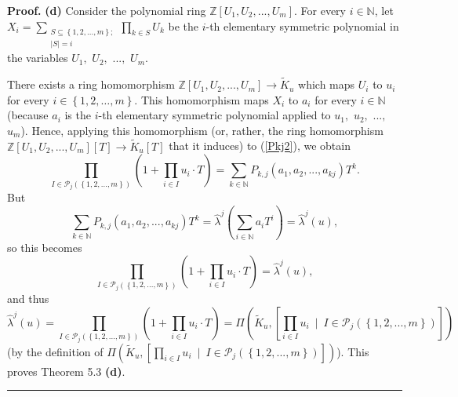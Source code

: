 \documentclass[numbers=enddot,12pt,final,onecolumn,notitlepage]{scrartcl}%
\newenvironment{proof}[1][Proof]{\noindent\textbf{#1.} }{\ \rule{0.5em}{0.5em}}
\begin{document}
\begin{proof}
\textbf{(d)} Consider the polynomial ring $\mathbb{Z}\left[  U_{1}%
,U_{2},...,U_{m}\right]  $. For every $i\in\mathbb{N}$, let $X_{i}%
=\sum\limits_{\substack{S\subseteq\left\{  1,2,...,m\right\}  ;\\\left\vert
S\right\vert =i}}\prod\limits_{k\in S}U_{k}$ be the $i$-th elementary
symmetric polynomial in the variables $U_{1},$ $U_{2},$ $...,$ $U_{m}$.

There exists a ring homomorphism $\mathbb{Z}\left[  U_{1},U_{2},...,U_{m}%
\right]  \rightarrow\widetilde{K}_{u}$ which maps $U_{i}$ to $u_{i}$ for every
$i\in\left\{  1,2,\ldots,m\right\}  $. This homomorphism maps $X_{i}$ to
$a_{i}$ for every $i\in\mathbb{N}$ (because $a_{i}$ is the $i$-th elementary
symmetric polynomial applied to $u_{1},$ $u_{2},$ $...,$ $u_{m}$). Hence,
applying this homomorphism (or, rather, the ring homomorphism $\mathbb{Z}%
\left[  U_{1},U_{2},...,U_{m}\right]  \left[  T\right]  \rightarrow
\widetilde{K}_{u}\left[  T\right]  $ that it induces) to (\ref{Pkj2}), we
obtain%
\[
\prod_{I\in\mathcal{P}_{j}\left(  \left\{  1,2,...,m\right\}  \right)
}\left(  1+\prod_{i\in I}u_{i}\cdot T\right)  =\sum_{k\in\mathbb{N}}%
P_{k,j}\left(  a_{1},a_{2},...,a_{kj}\right)  T^{k}.
\]
But%
\[
\sum_{k\in\mathbb{N}}P_{k,j}\left(  a_{1},a_{2},...,a_{kj}\right)
T^{k}=\widehat{\lambda}^{j}\left(  \sum_{i\in\mathbb{N}}a_{i}T^{i}\right)
=\widehat{\lambda}^{j}\left(  u\right)  ,
\]
so this becomes%
\[
\prod_{I\in\mathcal{P}_{j}\left(  \left\{  1,2,...,m\right\}  \right)
}\left(  1+\prod_{i\in I}u_{i}\cdot T\right)  =\widehat{\lambda}^{j}\left(
u\right)  ,
\]
and thus%
\[
\widehat{\lambda}^{j}\left(  u\right)  =\prod_{I\in\mathcal{P}_{j}\left(
\left\{  1,2,...,m\right\}  \right)  }\left(  1+\prod_{i\in I}u_{i}\cdot
T\right)  =\Pi\left(  \widetilde{K}_{u},\left[  \prod\limits_{i\in I}%
u_{i}\ \mid\ I\in\mathcal{P}_{j}\left(  \left\{  1,2,...,m\right\}  \right)
\right]  \right)
\]
(by the definition of $\Pi\left(  \widetilde{K}_{u},\left[  \prod\limits_{i\in
I}u_{i}\ \mid\ I\in\mathcal{P}_{j}\left(  \left\{  1,2,...,m\right\}  \right)
\right]  \right)  $). This proves Theorem 5.3 \textbf{(d)}.
\end{proof}
\end{document}
